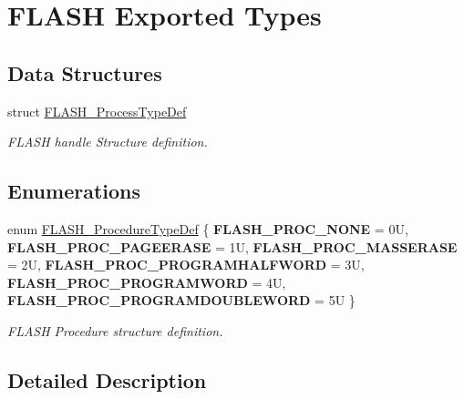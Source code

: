 \hypertarget{group___f_l_a_s_h___exported___types}{}\section{F\+L\+A\+SH Exported Types}
\label{group___f_l_a_s_h___exported___types}
\subsection*{Data Structures}
\begin{DoxyCompactItemize}
\item 
struct \hyperlink{struct_f_l_a_s_h___process_type_def}{F\+L\+A\+S\+H\+\_\+\+Process\+Type\+Def}
\begin{DoxyCompactList}\small\item\em F\+L\+A\+SH handle Structure definition. \end{DoxyCompactList}\end{DoxyCompactItemize}
\subsection*{Enumerations}
\begin{DoxyCompactItemize}
\item 
\mbox{\label{group___f_l_a_s_h___exported___types_ga2b0268387bc11bcab76be9ce7c43eaaf}} 
enum \hyperlink{group___f_l_a_s_h___exported___types_ga2b0268387bc11bcab76be9ce7c43eaaf}{F\+L\+A\+S\+H\+\_\+\+Procedure\+Type\+Def} \{ \newline
{\bfseries F\+L\+A\+S\+H\+\_\+\+P\+R\+O\+C\+\_\+\+N\+O\+NE} = 0U, 
{\bfseries F\+L\+A\+S\+H\+\_\+\+P\+R\+O\+C\+\_\+\+P\+A\+G\+E\+E\+R\+A\+SE} = 1U, 
{\bfseries F\+L\+A\+S\+H\+\_\+\+P\+R\+O\+C\+\_\+\+M\+A\+S\+S\+E\+R\+A\+SE} = 2U, 
{\bfseries F\+L\+A\+S\+H\+\_\+\+P\+R\+O\+C\+\_\+\+P\+R\+O\+G\+R\+A\+M\+H\+A\+L\+F\+W\+O\+RD} = 3U, 
\newline
{\bfseries F\+L\+A\+S\+H\+\_\+\+P\+R\+O\+C\+\_\+\+P\+R\+O\+G\+R\+A\+M\+W\+O\+RD} = 4U, 
{\bfseries F\+L\+A\+S\+H\+\_\+\+P\+R\+O\+C\+\_\+\+P\+R\+O\+G\+R\+A\+M\+D\+O\+U\+B\+L\+E\+W\+O\+RD} = 5U
 \}\begin{DoxyCompactList}\small\item\em F\+L\+A\+SH Procedure structure definition. \end{DoxyCompactList}
\end{DoxyCompactItemize}


\subsection{Detailed Description}
